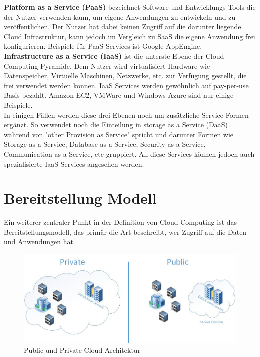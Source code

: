\textbf{Platform as a Service (PaaS)} bezeichnet Software und Entwicklungs Tools die der Nutzer verwenden kann, um eigene Anwendungen zu entwickeln und zu veröffentlichen. Der Nutzer hat dabei keinen Zugriff auf die darunter liegende Cloud Infrastruktur, kann jedoch im Vergleich zu SaaS die eigene Anwendung frei konfigurieren. Beispiele für PaaS Services ist Google AppEngine.
\\

\textbf{Infrastructure as a Service (IaaS)} ist die unterste Ebene der Cloud Computing Pyramide. Dem Nutzer wird virtualisiert Hardware wie Datenspeicher, Virtuelle Maschinen, Netzwerke, etc. zur Verfügung gestellt, die frei verwendet werden können. IaaS Services werden gewöhnlich auf pay-per-use Basis bezahlt. Amazon EC2, VMWare und Windows Azure sind nur einige Beispiele.
\\

In einigen Fällen werden diese drei Ebenen noch um zusätzliche Service Formen ergänzt. So verwendet \cite[S. 28]{Tharam.2010} noch die Einteilung in storage as a Service (DaaS) während \cite[S. 123]{Mahmood.2011} von "other Provision as Service" spricht und darunter Formen wie Storage as a Service, Database as a Service, Security as a Service, Communication as a Service, etc gruppiert. All diese Services können jedoch auch spezialisierte IaaS Services angesehen werden.


\section{Bereitstellung Modell}\label{bereitstellung}
Ein weiterer zentraler Punkt in der Definition von Cloud Computing ist das Bereitstellungsmodell, das primär die Art beschreibt, wer Zugriff auf die Daten und Anwendungen hat.

	\begin{figure}[h]
		\centering
		\includegraphics[width=0.9\linewidth]{images/private_public_cloud}
		\caption{Public und Private Cloud Architektur}
		\label{fig:PublicPrivateCloud}
	\end{figure}

